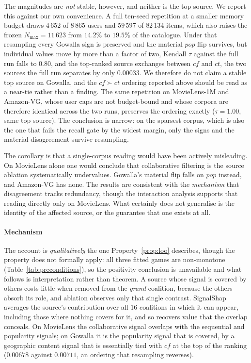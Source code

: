 \documentclass[pdflatex,sn-basic,Numbered]{sn-jnl}
\theoremstyle{plain}
\theoremstyle{definition}
\begin{document}
The magnitudes are \emph{not} stable, however, and neither is the top source.
We report this against our own convenience. A full ten-seed repetition at a
smaller memory budget draws $4\,652$ of $8\,865$ users and $59\,597$ of
$82\,134$ items, which also raises the frozen $N_{\max} = 11\,623$ from
$14.2\%$ to $19.5\%$ of the catalogue. Under that resampling every Gowalla sign
is preserved and the material $pop$ flip survives, but individual values move
by more than a factor of two, Kendall $\tau$ against the full run falls to
$0.80$, and the top-ranked source exchanges between $cf$ and $ct$, the two
sources the full run separates by only $0.00033$. We therefore do not claim a
stable top source on Gowalla, and the $cf \succ ct$ ordering reported above
should be read as a near-tie rather than a finding. The same repetition on
MovieLens-1M and Amazon-VG, whose user caps are not budget-bound and whose
corpora are therefore identical across the two runs, preserves the ordering
exactly ($\tau = 1.00$, same top source). The conclusion is narrow: on the
sparsest corpus, which is also the one that fails the recall gate by the widest
margin, only the signs and the material disagreement survive resampling.

The corollary is that a single-corpus reading would have been actively
misleading. On MovieLens alone one would conclude that collaborative filtering
is the source ablation systematically undervalues. Gowalla's material flip
falls on $pop$ instead, and Amazon-VG has none. The results are consistent
with the
\emph{mechanism} that disagreement tracks redundancy, though the interaction
analysis supports that reading directly only on MovieLens. What certainly does
not generalise is the identity of the affected source, or the guarantee that
one exists at all.

\paragraph{Mechanism}
The account is \emph{qualitatively} the one Property~\ref{prop:loo} describes,
though the property does not formally apply: all three fitted games are
non-monotone (Table~\ref{tab:preconditions}), so the positivity conclusion is
unavailable and what follows is interpretation rather than theorem. A source
whose signal is covered by others costs little when removed from the
\emph{grand} coalition, because the others absorb its role, and ablation
observes only that single contrast. SignalShap averages the source's
contribution over all $16$ coalitions in which it can appear, including those
where nothing covers for it, and so recovers value that the overlap conceals.
On MovieLens the collaborative signal overlaps with the sequential and
popularity signals; on Gowalla it is the popularity signal that is covered, by
a geographic content signal that is essentially tied with $cf$ at the top of
the ranking ($0.00678$ against $0.00711$, an ordering that resampling
reverses).
\end{document}
